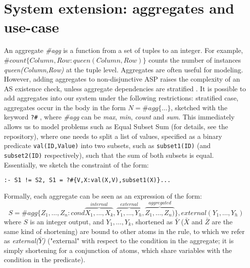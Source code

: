 
\section{System extension: aggregates and use-case}\label{section:aggregates}
An aggregate \textit{\#agg} is a function from a set of tuples to an integer. For example,\\$\#\textit{count}\{ Column,Row: \textit{queen}(Column,Row) \}$ counts the number of instances\\\textit{queen(Column,Row)} at the tuple level. Aggregates are often useful for modeling. 
However, adding aggregates to non-disjunctive ASP raises the complexity of an AS existence check, unless aggregate dependencies are stratified \cite{aggregates_complexity}. It is possible to add aggregates into our system under the following restrictions: stratified case, aggregates occur in the body in the form ${N = \#\textit{agg}\{ \dots \}}$, sketched with the keyword \verb|?#| , where \textit{\#agg} can be \textit{max}, \textit{min}, \textit{count} and \textit{sum}. This immediately allows us  to model problems such as Equal Subset Sum (for details, see the repository), where one needs to split a list of values, specified as a binary predicate   \verb|val(ID,Value)| into two subsets, such as \verb|subset1(ID)| (and \verb|subset2(ID)| respectively), such that the sum of both subsets is equal. Essentially, we sketch the constraint of the form: 

\verb|:- S1 != S2, S1 = ?#{V,X:val(X,V),subset1(X)}...|

Formally, each aggregate can be seen as an expression of the form:
\begin{equation*}
	S = \#\textit{agg}\{ Z_1,\dots,Z_n: \textit{cond}\overbrace{X_1,\dots,X_k}^{\textit{internal}}, \overbrace{Y_1,\dots,Y_h}^{\textit{external}},\overbrace{Z_1,\dots,Z_n)}^{\textit{aggregated}} \}, \textit{external}(Y_1,\dots,Y_h)
\end{equation*}
	where $S$ is an integer output, and $Y_1,\dots,Y_k$, shortened as $\bar Y$ ($\bar X$ and $\bar Z$ are the same kind of shortening) are bound to other atoms in the rule, to which we refer as \textit{external($\bar Y$)} ("external" with respect to the condition in the aggregate; it is simply shortening for a conjunction of atoms, which share variables with the condition in the predicate). 

